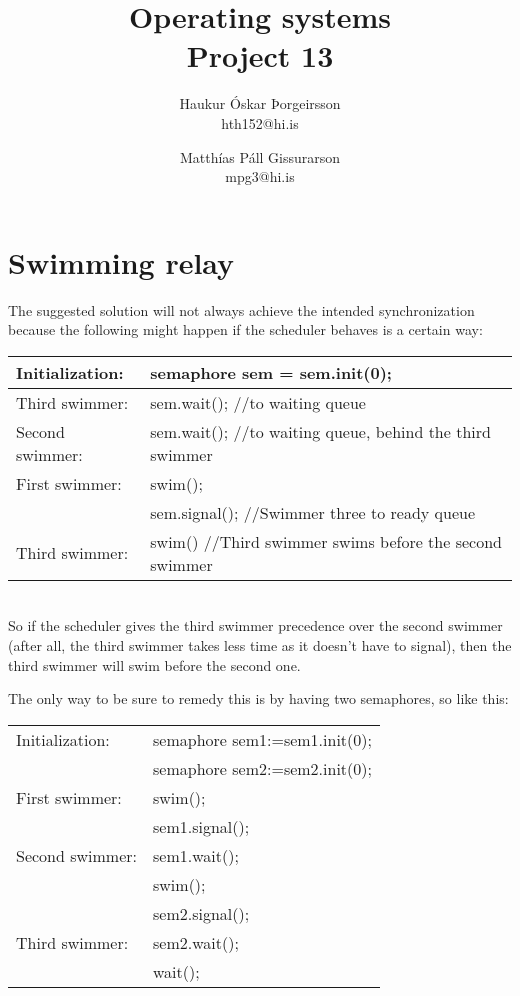 \documentclass[10pt,a4paper]{article}
\begin{document}
\title{Operating systems\\Project 13}
\author{
    Haukur Óskar Þorgeirsson\\
    hth152@hi.is \and
    Matthías Páll Gissurarson\\
    mpg3@hi.is}
\maketitle

\section{Swimming relay}

The suggested solution will not always achieve the intended synchronization because the following might happen if the scheduler behaves is a certain way:\\

\begin{tabular}{|ll|}
\hline
Initialization:&semaphore sem = sem.init(0);\\
\hline
Third swimmer:&sem.wait(); //to waiting queue\\ \hline
Second swimmer:&sem.wait(); //to waiting queue, behind the third swimmer\\ \hline
First swimmer:&swim();\\
&sem.signal(); //Swimmer three to ready queue\\ \hline
Third swimmer:&swim() //Third swimmer swims before the second swimmer\\ \hline
\end{tabular}\\

So if the scheduler gives the third swimmer precedence over the second swimmer (after all, the third swimmer takes less time as it doesn't have to signal), then the third swimmer will swim before the second one.

The only way to be sure to remedy this is by having two semaphores, so like this:\\

\begin{tabular}{|ll|} \hline
Initialization:	&semaphore sem1:=sem1.init(0);\\
                &semaphore sem2:=sem2.init(0);\\ \hline
First swimmer:  &swim();\\
                &sem1.signal();\\ \hline
Second swimmer: &sem1.wait();\\
                &swim();\\
                &sem2.signal();\\ \hline
Third swimmer:  &sem2.wait();\\
                &wait();\\ \hline
\end{tabular}
\end{document}
